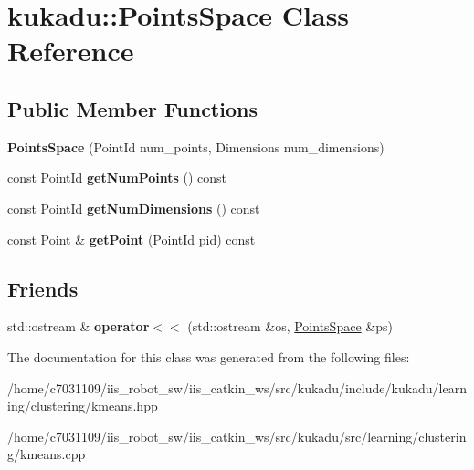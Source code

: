 \hypertarget{classkukadu_1_1PointsSpace}{\section{kukadu\-:\-:Points\-Space Class Reference}
\label{classkukadu_1_1PointsSpace}
}
\subsection*{Public Member Functions}
\begin{DoxyCompactItemize}
\item 
\hypertarget{classkukadu_1_1PointsSpace_a5a07cded0e8d9f863e4148e292fc4819}{{\bfseries Points\-Space} (Point\-Id num\-\_\-points, Dimensions num\-\_\-dimensions)}\label{classkukadu_1_1PointsSpace_a5a07cded0e8d9f863e4148e292fc4819}

\item 
\hypertarget{classkukadu_1_1PointsSpace_a72b707dcad9ec5cbf9eb056848f5a13a}{const Point\-Id {\bfseries get\-Num\-Points} () const }\label{classkukadu_1_1PointsSpace_a72b707dcad9ec5cbf9eb056848f5a13a}

\item 
\hypertarget{classkukadu_1_1PointsSpace_a11f7b273471ae09eac6b0069df903a24}{const Point\-Id {\bfseries get\-Num\-Dimensions} () const }\label{classkukadu_1_1PointsSpace_a11f7b273471ae09eac6b0069df903a24}

\item 
\hypertarget{classkukadu_1_1PointsSpace_ac984b05c87343f7d71e49a467cecd594}{const Point \& {\bfseries get\-Point} (Point\-Id pid) const }\label{classkukadu_1_1PointsSpace_ac984b05c87343f7d71e49a467cecd594}

\end{DoxyCompactItemize}
\subsection*{Friends}
\begin{DoxyCompactItemize}
\item 
\hypertarget{classkukadu_1_1PointsSpace_a1a8e4dc95f93b9aa303dda0349f1feec}{std\-::ostream \& {\bfseries operator$<$$<$} (std\-::ostream \&os, \hyperlink{classkukadu_1_1PointsSpace}{Points\-Space} \&ps)}\label{classkukadu_1_1PointsSpace_a1a8e4dc95f93b9aa303dda0349f1feec}

\end{DoxyCompactItemize}


The documentation for this class was generated from the following files\-:\begin{DoxyCompactItemize}
\item 
/home/c7031109/iis\-\_\-robot\-\_\-sw/iis\-\_\-catkin\-\_\-ws/src/kukadu/include/kukadu/learning/clustering/kmeans.\-hpp\item 
/home/c7031109/iis\-\_\-robot\-\_\-sw/iis\-\_\-catkin\-\_\-ws/src/kukadu/src/learning/clustering/kmeans.\-cpp\end{DoxyCompactItemize}
